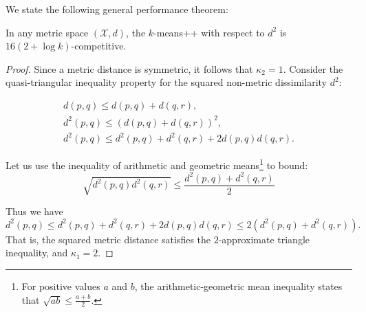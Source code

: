 \documentclass[graybox]{svmult}
\def\calX{\mathcal{X}}
\begin{document}
We state the following general performance theorem:

\begin{theorem}\label{theo:kmms}
In any metric space $(\calX,d)$,
the $k$-means++ with respect to $d^2$ is $16(2+\log k)$-competitive.
\end{theorem}
\begin{proof}
Since a metric distance is symmetric, it follows that $\kappa_2=1$.
Consider the quasi-triangular inequality property for the squared non-metric dissimilarity $d^2$:

\begin{eqnarray}
d(p,q) \leq d(p,q)+d(q,r),\\
d^2(p,q) \leq (d(p,q)+d(q,r))^2,\\
d^2(p,q) \leq d^2(p,q)+d^2(q,r)+2d(p,q)d(q,r).
\end{eqnarray}

Let us use the inequality of arithmetic and geometric means\footnote{For positive values $a$ and $b$, the arithmetic-geometric mean inequality states that $\sqrt{ab}\leq\frac{a+b}{2}$.} to bound:
\begin{equation}
\sqrt{d^2(p,q)d^2(q,r)} \leq \frac{d^2(p,q)+d^2(q,r)}{2}
\end{equation}

Thus we have
\begin{equation}
d^2(p,q) \leq d^2(p,q)+d^2(q,r)+2d(p,q)d(q,r)\leq 2(d^2(p,q)+d^2(q,r)).
\end{equation}
That is, the squared metric distance satisfies the $2$-approximate triangle inequality, and $\kappa_1=2$.
\end{proof}
\end{document}
